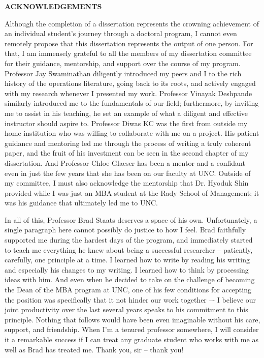 
\begin{center}
\vspace*{52pt}
{\normalfont \textbf{ACKNOWLEDGEMENTS}} \\
\end{center}
Although the completion of a dissertation represents the crowning achievement of an individual student’s journey through a doctoral program, I cannot even remotely propose that this dissertation represents the output of one person. For that, I am immensely grateful to all the members of my dissertation committee for their guidance, mentorship, and support over the course of my program. Professor Jay Swaminathan diligently introduced my peers and I to the rich history of the operations literature, going back to its roots, and actively engaged with my research whenever I presented my work. Professor Vinayak Deshpande similarly introduced me to the fundamentals of our field; furthermore, by inviting me to assist in his teaching, he set an example of what a diligent and effective instructor should aspire to. Professor Diwas KC was the first from outside my home institution who was willing to collaborate with me on a project. His patient guidance and mentoring led me through the process of writing a truly coherent paper, and the fruit of his investment can be seen in the second chapter of my dissertation. And Professor Chloe Glaeser has been a mentor and a confidant even in just the few years that she has been on our faculty at UNC. Outside of my committee, I must also acknowledge the mentorship that Dr. Hyoduk Shin provided while I was just an MBA student at the Rady School of Management; it was his guidance that ultimately led me to UNC.

In all of this, Professor Brad Staats deserves a space of his own. Unfortunately, a single paragraph here cannot possibly do justice to how I feel. Brad faithfully supported me during the hardest days of the program, and immediately started to teach me everything he knew about being a successful researcher – patiently, carefully, one principle at a time. I learned how to write by reading his writing and especially his changes to my writing. I learned how to think by processing ideas with him. And even when he decided to take on the challenge of becoming the Dean of the MBA program at UNC, one of his few conditions for accepting the position was specifically that it not hinder our work together –- I believe our joint productivity over the last several years speaks to his commitment to this principle. Nothing that follows would have been even imaginable without his care, support, and friendship. When I’m a tenured professor somewhere, I will consider it a remarkable success if I can treat any graduate student who works with me as well as Brad has treated me. Thank you, sir – thank you!

